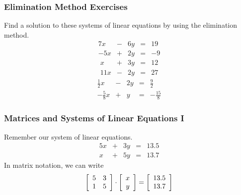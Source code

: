 \documentclass[xcolor=dvipsnames]{beamer}
\begin{document}
\begin{frame}
  \frametitle{Elimination Method Exercises}
Find a solution to these systems of linear equations by using the
elimination method.
  \begin{equation}
    \label{eq:eighilai}
    \begin{array}{rcrcl}
      7x&-&6y&=&19 \\
      -5x&+&2y&=&-9
    \end{array}
  \end{equation}
  \begin{equation}
    \label{eq:thidaitu}
    \begin{array}{rcrcl}
      x&+&3y&=&12 \\
      11x&-&2y&=&27
    \end{array}
  \end{equation}
  \begin{equation}
    \label{eq:ohkaicux}
    \begin{array}{rcrcl}
      \frac{1}{2}x&-&2y&=&\frac{9}{2} \\
      -\frac{5}{8}x&+&y&=&-\frac{15}{8}
    \end{array}
  \end{equation}
\end{frame}

\begin{frame}
  \frametitle{Matrices and Systems of Linear Equations I}
Remember our system of linear equations. 
  \begin{equation}
    \label{eq:ahgohcoh}
    \begin{array}{rcrcl}
      5x & + & 3y & = & 13.5 \\
      x  & + & 5y & = & 13.7
    \end{array}
  \end{equation}
In matrix notation, we can write
  \begin{equation}
    \label{eq:neithohn}
  \left[\begin{array}{cc}
5        & 3                 \\
 1       & 5
  \end{array}\right]\cdot
  \left[\begin{array}{c}
 x                 \\
 y
  \end{array}\right]=
  \left[\begin{array}{c}
13.5                 \\
13.7
  \end{array}\right]\notag
  \end{equation}
\end{frame}
\end{document}
